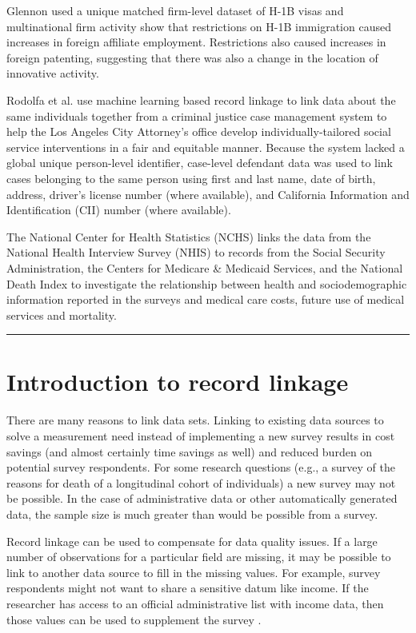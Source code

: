 \documentclass[]{krantz}
\begin{document}
Glennon \citeyearpar{Glennon2019} used a unique matched firm-level
dataset of H-1B visas and multinational firm activity show that
restrictions on H-1B immigration caused increases in foreign affiliate
employment. Restrictions also caused increases in foreign patenting,
suggesting that there was also a change in the location of innovative
activity.

Rodolfa et al. \citeyearpar{Rodolfa2020} use machine learning based
record linkage to link data about the same individuals together from a
criminal justice case management system to help the Los Angeles City
Attorney's office develop individually-tailored social service
interventions in a fair and equitable manner. Because the system lacked
a global unique person-level identifier, case-level defendant data was
used to link cases belonging to the same person using first and last
name, date of birth, address, driver's license number (where available),
and California Information and Identification (CII) number (where
available).

The National Center for Health Statistics (NCHS) \citeyearpar{NCHS2019}
links the data from the National Health Interview Survey (NHIS) to
records from the Social Security Administration, the Centers for
Medicare \& Medicaid Services, and the National Death Index to
investigate the relationship between health and sociodemographic
information reported in the surveys and medical care costs, future use
of medical services and mortality.

\begin{center}\rule{0.5\linewidth}{\linethickness}\end{center}

\section{Introduction to record linkage}\label{sec:recordlinkage}

There are many reasons to link data sets. Linking to existing data
sources to solve a measurement need instead of implementing a new survey
results in cost savings (and almost certainly time savings as well) and
reduced burden on potential survey respondents. For some research
questions (e.g., a survey of the reasons for death of a longitudinal
cohort of individuals) a new survey may not be possible. In the case of
administrative data or other automatically generated data, the sample
size is much greater than would be possible from a survey.

Record linkage can be used to compensate for data quality issues. If a
large number of observations for a particular field are missing, it may
be possible to link to another data source to fill in the missing
values. For example, survey respondents might not want to share a
sensitive datum like income. If the researcher has access to an official
administrative list with income data, then those values can be used to
supplement the survey \citep{abowd2006final}.
\end{document}
